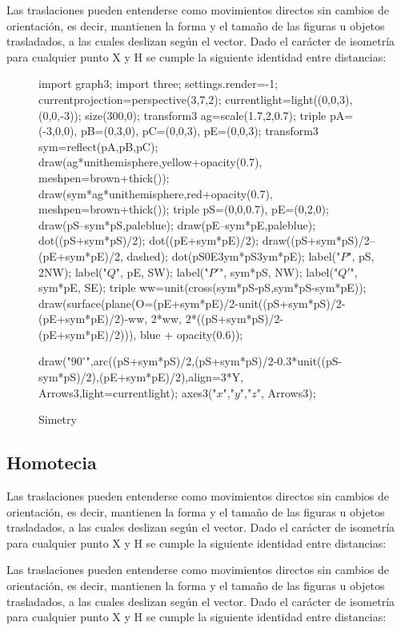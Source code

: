 Las traslaciones pueden entenderse como movimientos directos sin cambios de orientación, es decir, mantienen la forma y el tamaño de las figuras u objetos trasladados, a las cuales deslizan según el vector. Dado el carácter de isometría para cualquier punto X y H se cumple la siguiente identidad entre distancias:

\begin{figure}[!ht]
	\centering
	\begin{asy}
	import graph3;
	import three;
	settings.render=-1;
	currentprojection=perspective(3,7,2);
	currentlight=light((0,0,3),(0,0,-3));
	size(300,0);
	transform3 ag=scale(1.7,2,0.7);
	triple pA=(-3,0,0), pB=(0,3,0), pC=(0,0,3), pE=(0,0,3);
	transform3 sym=reflect(pA,pB,pC);
	draw(ag*unithemisphere,yellow+opacity(0.7), meshpen=brown+thick());
	draw(sym*ag*unithemisphere,red+opacity(0.7), meshpen=brown+thick());
	triple pS=(0,0,0.7), pE=(0,2,0);
	draw(pS--sym*pS,paleblue);
	draw(pE--sym*pE,paleblue);
	dot((pS+sym*pS)/2);
	dot((pE+sym*pE)/2);
	draw((pS+sym*pS)/2--(pE+sym*pE)/2, dashed);
	dot(pS^^pE^^sym*pS^^sym*pE);
	label("$P$", pS, 2NW);
	label("$Q$", pE, SW);
	label("$P'$", sym*pS, NW);
	label("$Q'$", sym*pE, SE);
	triple ww=unit(cross(sym*pS-pS,sym*pS-sym*pE));
	draw(surface(plane(O=(pE+sym*pE)/2-unit((pS+sym*pS)/2-(pE+sym*pE)/2)-ww, 2*ww, 2*((pS+sym*pS)/2-(pE+sym*pE)/2))), blue + opacity(0.6));

	draw("$90^\circ$",arc((pS+sym*pS)/2,(pS+sym*pS)/2-0.3*unit((pS-sym*pS)/2),(pE+sym*pE)/2),align=3*Y,  Arrows3,light=currentlight);
	axes3("$x$","$y$","$z$", Arrows3);

	\end{asy}
	\caption{Simetry}
\end{figure}
\subsection{Homotecia}
Las traslaciones pueden entenderse como movimientos directos sin cambios de orientación, es decir, mantienen la forma y el tamaño de las figuras u objetos trasladados, a las cuales deslizan según el vector. Dado el carácter de isometría para cualquier punto X y H se cumple la siguiente identidad entre distancias:

Las traslaciones pueden entenderse como movimientos directos sin cambios de orientación, es decir, mantienen la forma y el tamaño de las figuras u objetos trasladados, a las cuales deslizan según el vector. Dado el carácter de isometría para cualquier punto X y H se cumple la siguiente identidad entre distancias:


